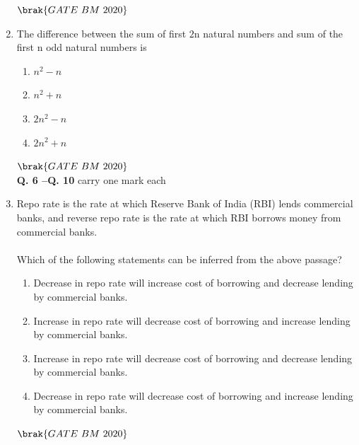 \documentclass[journal,12pt,onecolumn]{IEEEtran}
\theoremstyle{remark}
\begin{document}
\begin{enumerate}
\begin{enumerate}
 \end{enumerate}
   \hfill $\brak{GATE\ BM\ 2020}$\\
   

 \item The difference between the sum of first $2$n natural numbers and sum of the first n odd natural numbers is\underline {\hspace{2cm}}
 
 \begin{enumerate}
     \item \hspace{0.5cm}$n^2-n$
     \item \hspace{0.5cm}$n^2+n$
     \item \hspace{0.5cm}$2n^2-n$
     \item \hspace{0.5cm}$2n^2+n$
     
 \end{enumerate}
\hfill $\brak{GATE\ BM\ 2020}$\\

  \noindent \textbf{Q. 6 --Q.  \textbf{10}} carry one mark each
  
\item Repo rate is the rate at which Reserve Bank of India (RBI) lends commercial banks, and reverse repo rate is the rate at which RBI borrows money from commercial banks.\\
\\Which of the following statements can be inferred from the above passage?
\begin{enumerate}
    \item \hspace{0.5cm}Decrease in repo rate will increase cost of borrowing and decrease lending by commercial banks.
    \item \hspace{0.5cm}Increase in repo rate will decrease cost of borrowing and increase lending by commercial banks.
    \item \hspace{0.5cm}Increase in repo rate will decrease cost of borrowing and decrease lending by commercial banks.
    \item \hspace{0.5cm}Decrease in repo rate will decrease cost of borrowing and increase lending by commercial banks.\\
    \end{enumerate}
\hfill $\brak{GATE\ BM\ 2020}$\\


\end{enumerate}
\end{document}

